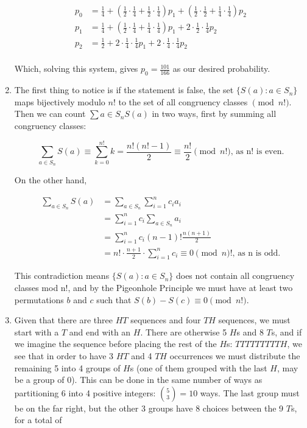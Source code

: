\documentclass{book}
\numberwithin{equation}{section}
\begin{document}
\begin{enumerate}[label={9.\arabic*}]
\begin{align*}
p_0 & = \frac{1}{4} + \left(\frac{1}{2}\cdot\frac{1}{4} + \frac{1}{2}\cdot\frac{1}{4}\right)p_1 + \left(\frac{1}{2}\cdot\frac{1}{2} + \frac{1}{4}\cdot\frac{1}{4}\right)p_2 \\
p_1 & = \frac{1}{4} + \left(\frac{1}{2}\cdot\frac{1}{4} + \frac{1}{4}\cdot\frac{1}{4}\right)p_1 + 2\cdot\frac{1}{2}\cdot\frac{1}{4}p_2 \\
p_2 & = \frac{1}{2} + 2\cdot\frac{1}{4}\cdot\frac{1}{4}p_1 + 2\cdot\frac{1}{4}\cdot\frac{1}{4}p_2 \\
\end{align*}

Which, solving this system, gives $p_0 = \frac{101}{166}$ as our desired probability.

\item
The first thing to notice is if the statement is false, the set $\{S(a) : a \in S_n\}$ maps bijectively modulo $n!$ to the
set of all congruency classes $\pmod{n!}$. Then we can count $\sum{a \in S_n}S(a)$ in two ways, first by summing
all congruency classes:

$$\sum_{a \in S_n}S(a) \equiv \sum_{k=0}^{n!} k = \frac{n!(n! - 1)}{2} \equiv \frac{n!}{2} \pmod{n!} \text{, as n! is even.}$$

On the other hand,

\begin{align*}
\sum_{a \in S_n}S(a) & = \sum_{a \in S_n}\sum_{i=1}^n c_i a_i \\
& = \sum_{i=1}^n c_i \sum_{a \in S_n} a_i \\
& = \sum_{i=1}^n c_i (n-1)!\frac{n(n+1)}{2} \\
& = n! \cdot \frac{n+1}{2}\cdot \sum_{i=1}^n c_i \equiv 0 {\pmod n!} \text{, as n is odd.}
\end{align*}

This contradiction means $\{S(a) : a \in S_n\}$ does not contain all congruency classes mod n!, and by the Pigeonhole
Principle we must have at least two permutations $b$ and $c$ such that $S(b) - S(c) \equiv 0 \pmod{n!}$.

\item
Given that there are three $HT$ sequences and four $TH$ sequences, we must start with a $T$ and end with an $H$.
There are otherwise 5 $H$s and 8 $T$s, and if we imagine the sequence before placing the rest of the $H$s:
$TTTTTTTTTH$, we see that in order to have 3 $HT$ and 4 $TH$ occurrences we must distribute the remaining 5
into 4 groups of $H$s (one of them grouped with the last $H$, may be a group of 0). This can be done in the same
number of ways as partitioning 6 into 4 positive integers: ${5 \choose 3} = 10$ ways. The last group must be on the
far right, but the other 3 groups have 8 choices between the 9 $T$s, for a total of


\end{enumerate}
\end{document}
